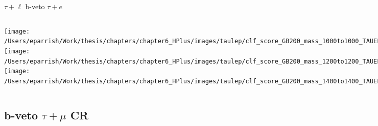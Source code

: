 \documentclass[aspectratio=169,xcolor=table]{beamer}
\begin{document}
    \begin{frame}[t]{$\tau+\ell$ b-veto $\tau+e$}
      \begin{columns}[t]
          \texttt{[image: /Users/eparrish/Work/thesis/chapters/chapter6\_HPlus/images/taulep/clf\_score\_GB200\_mass\_1000to1000\_TAUEL\_BVETO.png]}
          \texttt{[image: /Users/eparrish/Work/thesis/chapters/chapter6\_HPlus/images/taulep/clf\_score\_GB200\_mass\_1200to1200\_TAUEL\_BVETO.png]}
          \texttt{[image: /Users/eparrish/Work/thesis/chapters/chapter6\_HPlus/images/taulep/clf\_score\_GB200\_mass\_1400to1400\_TAUEL\_BVETO.png]}

          \texttt{[image: /Users/eparrish/Work/thesis/chapters/chapter6\_HPlus/images/taulep/clf\_score\_GB200\_mass\_1600to1600\_TAUEL\_BVETO.png]}
          \texttt{[image: /Users/eparrish/Work/thesis/chapters/chapter6\_HPlus/images/taulep/clf\_score\_GB200\_mass\_1800to1800\_TAUEL\_BVETO.png]}
          \texttt{[image: /Users/eparrish/Work/thesis/chapters/chapter6\_HPlus/images/taulep/clf\_score\_GB200\_mass\_2000to2000\_TAUEL\_BVETO.png]}

          \texttt{[image: /Users/eparrish/Work/thesis/chapters/chapter6\_HPlus/images/taulep/clf\_score\_GB200\_mass\_2500to2500\_TAUEL\_BVETO.png]}
          \texttt{[image: /Users/eparrish/Work/thesis/chapters/chapter6\_HPlus/images/taulep/clf\_score\_GB200\_mass\_3000to3000\_TAUEL\_BVETO.png]}


      \end{columns}
    \end{frame}

  \subsection{b-veto $\tau+\mu$ CR}
\end{document}
